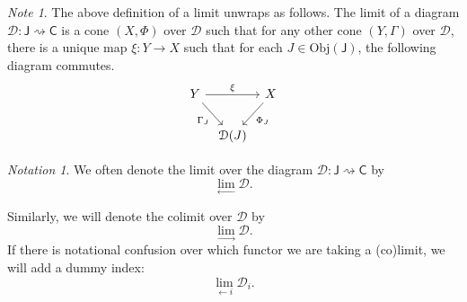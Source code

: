 \documentclass[a4paper]{report}
\newcommand{\Obj}{\mathrm{Obj}}
\theoremstyle{definition}
\theoremstyle{plain}
\theoremstyle{remark}
\newtheorem{note}{Note}[section]
\newtheorem{notation}{Notation}[section]
\begin{document}
\begin{note}
  The above definition of a limit unwraps as follows. The limit of a diagram $\mathcal{D}\colon \mathsf{J} \rightsquigarrow \mathsf{C}$ is a cone $(X, \Phi)$ over $\mathcal{D}$ such that for any other cone $(Y, \Gamma)$ over $\mathcal{D}$, there is a unique map $\xi\colon Y \to X$ such that for each $J \in \Obj(\mathsf{J})$, the following diagram commutes.
  \begin{equation*}
    \begin{tikzcd}[column sep=tiny]
      Y
      \arrow[rr, "\xi"]
      \arrow[dr, swap, "\Gamma_{J}"]
      & & X
      \arrow[dl, "\Phi_{J}"]
      \\
      & \mathcal{D}(J)
    \end{tikzcd}
  \end{equation*}
\end{note} 

\begin{notation}
  We often denote the limit over the diagram $\mathcal{D}\colon \mathsf{J} \rightsquigarrow \mathsf{C}$ by 
  \begin{equation*}
    \lim_{\leftarrow} \mathcal{D}.
  \end{equation*}

  Similarly, we will denote the colimit over $\mathcal{D}$ by 
  \begin{equation*}
    \lim_{\rightarrow} \mathcal{D}.
  \end{equation*}
  If there is notational confusion over which functor we are taking a (co)limit, we will add a dummy index:
  \begin{equation*}
    \lim_{\leftarrow i} \mathcal{D}_{i}.
  \end{equation*}
\end{notation}
\end{document}

